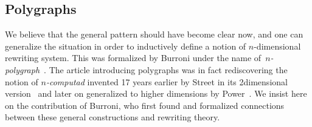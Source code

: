 \documentclass{LMCS}
\begin{document}
\subsection{Polygraphs}
\label{sec:polygraphs}
We believe that the general pattern should have become clear now, and one can
generalize the situation in order to inductively define a notion of
$n$-dimensional rewriting system. This was formalized by Burroni under the name
of~\emph{$n$-polygraph}~\cite{burroni:higher-word}. The article introducing
polygraphs was in fact rediscovering the notion of \emph{$n$-computad} invented
17 years earlier by Street in its 2\nbd{}dimensional
version~\cite{street:limit-indexed-by-functors} and later on generalized to
higher dimensions by Power~\cite{power:n-cat-pasting}. We insist here on the
contribution of Burroni, who first found and formalized connections between
these general constructions and rewriting theory.
\end{document}
